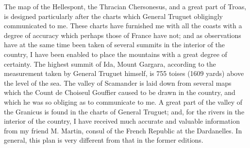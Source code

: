 \documentclass[a4paper, 11pt, oneside, polutonikogreek, english]{article}
\begin{document}
The map of the Hellespont, the Thracian Chersonesus, and a great part of Troas, is designed particularly after the charts which General Truguet obligingly communicated to me. These charts have furnished me with all the coasts with a degree of accuracy which perhaps those of France have not; and as observations have at the same time been taken of several summits in the interior of the country, I have been enabled to place the mountains with a great degree of certainty. The highest summit of Ida, Mount Gargara, according to the measurement taken by General Truguet himself, is 755 toises (1609 yards) above the level of the sea. The valley of Scamander is laid down from several maps which the Count de Choiseul Gouffier caused to be drawn in the country, and which he was so obliging as to communicate to me. A great part of the valley of the Granicus is found in the charts of General Truguet; and, for the rivers in the interior of the country, I have received much accurate and valuable information from my friend M. Martin, consul of the French Republic at the Dardanelles. In general, this plan is very different from that in the former editions.
\end{document}
